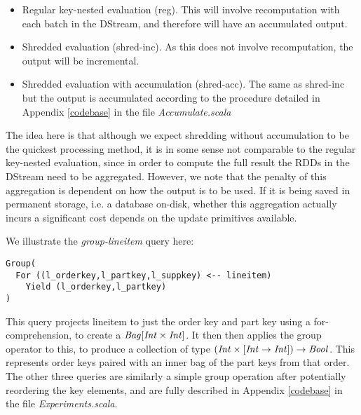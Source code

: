 \begin{itemize}
\item{Regular key-nested evaluation (reg). This will involve recomputation with each batch in the DStream, and therefore will have an accumulated output.}
\item{Shredded evaluation (shred-inc). As this does not involve recomputation, the output will be incremental.}
\item{Shredded evaluation with accumulation (shred-acc). The same as shred-inc but the output is accumulated according to the procedure detailed in Appendix \ref{codebase} in the file \textit{Accumulate.scala}}
\end{itemize}

The idea here is that although we expect shredding without accumulation to be the quickest processing method, it is in some sense not comparable to the regular key-nested evaluation, since in order to compute the full result the RDDs in the DStream need to be aggregated. However, we note that the penalty of this aggregation is dependent on how the output is to be used. If it is being saved in permanent storage, i.e. a database on-disk, whether this aggregation actually incurs a significant cost depends on the update primitives available.

We illustrate the \textit{group-lineitem} query here:
\vs\begin{lstlisting}
Group(
  For ((l_orderkey,l_partkey,l_suppkey) <-- lineitem)
    Yield (l_orderkey,l_partkey)
)
\end{lstlisting}\vs

This query projects lineitem to just the order key and part key using a for-comprehension, to create a $\textrm{\textit{Bag}}[\textrm{\textit{Int}} \times \textrm{\textit{Int}}]$. It then then applies the group operator to this, to produce a collection of type $(\textrm{\textit{Int}} \times [\textrm{\textit{Int}} \rightarrow \textrm{\textit{Int}}]) \rightarrow \textrm{\textit{Bool}}$. This represents order keys paired with an inner bag of the part keys from that order.
The other three queries are similarly a simple group operation after potentially reordering the key elements, and are fully described in Appendix \ref{codebase} in the file \textit{Experiments.scala}.

